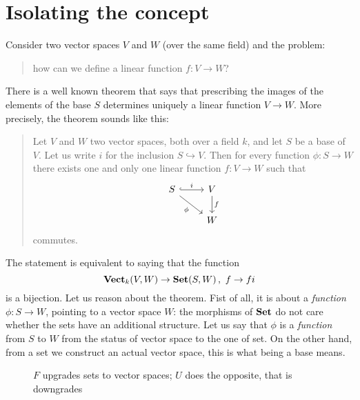 
\section{Isolating the concept}

\begin{example}\label{example:DefineLinearFunctionsI}
Consider two vector spaces \(V\) and \(W\) (over the same field) and the problem:
%
\begin{quotation}
how can we define a linear function \(f : V \to W\)?
\end{quotation}
%
There is a well known theorem that says that prescribing the images of the elements of the base \(S\) determines uniquely a linear function \(V \to W\). More precisely, the theorem sounds like this:
%
\begin{quotation}
Let \(V\) and \(W\) two vector spaces, both over a field \(k\), and let \(S\) be a base of \(V\). Let us write \(i\) for the inclusion \(S \hookrightarrow V\). Then for every function \(\phi : S \to W\) there exists one and only one linear function \(f : V \to W\) such that
\begin{equation}\begin{tikzcd}
S \ar["{i}", r, hook] \ar["\phi", dr, swap] & V \ar["f", d] \\
& W
\end{tikzcd}\label{diagram:FunctionsExtendsToALinearMapI}\end{equation}
commutes.
\end{quotation}
%
The statement is equivalent to saying that the function
\begin{equation}
\mathbf{Vect}_k(V, W) \to \mathbf{Set}(S, W) \,,\ f \to fi \label{function:AdjBijSetVectI}
\end{equation}
is a bijection.\newline
Let us reason about the theorem. Fist of all, it is about a {\em function} \(\phi : S \to W\), pointing to a vector space \(W\): the morphisms of \(\mathbf{Set}\) do not care whether the sets have an additional structure. Let us say that \(\phi\) is a {\em function} from \(S\) to \(W\)  from the status of vector space to the one of set. On the other hand, from a set we construct an actual vector space, this is what being a base means.
%
\begin{figure}
\centering

\caption{\(F\) upgrades sets to vector spaces; \(U\) does the opposite, that is downgrades}

\end{figure}
\end{example}
